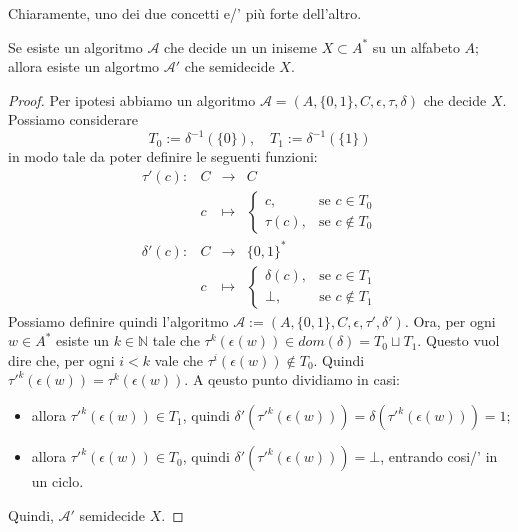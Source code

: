Chiaramente, uno dei due concetti e/' più forte dell'altro.
\begin{prop}
    Se esiste un algoritmo 
    $\mathcal A$
    che decide un un iniseme 
    $X \subset A^*$ su un alfabeto $A$;
    allora esiste un algortmo $\mathcal A'$
    che semidecide $X$.
    \begin{proof}
        Per ipotesi abbiamo un algoritmo
        $\mathcal A = (A,\{ 0,1\},C,\epsilon,\tau , \delta)$
        che decide $X$.
        Possiamo considerare
        \[
        T_0:=\delta^{-1}(\{0\}), \quad  T_1:=\delta^{-1}(\{1\})
        \]
        in modo tale da poter definire le seguenti funzioni:
        \[
        \begin{matrix}
        \tau'(c): & C & \to & C
            \\ & c & \mapsto &
        \left\{
            \begin{matrix}
                c, & \text{se } c \in T_0
                \\
                \tau (c), & \text{se } c \notin T_0
            \end{matrix}
        \right.
        \end{matrix}
        \] 
        \[
        \begin{matrix}
        \delta'(c): & C &\to & \{0,1\}^*
        \\& c & \mapsto &
        \left\{
            \begin{matrix}
                \delta (c), & \text{se } c \in T_1
                \\
                \bot, & \text{se } c \notin T_1
            \end{matrix}
        \right.
        \end{matrix}
        \]
    Possiamo definire quindi l'algoritmo
    $\mathcal A := (A,\{ 0,1\},C,\epsilon,\tau' , \delta')$. 
        Ora, per ogni 
        $w \in A^*$
        esiste un $k \in \mathbb N$
        tale che $\tau ^k(\epsilon (w)) \in dom(\delta)=T_0 \sqcup T_1$.
        Questo vuol dire che, per ogni $i <k$ vale che 
        $\tau ^i(\epsilon (w))\notin T_0$.
        Quindi $\tau'^{k}(\epsilon(w))=\tau^{k}(\epsilon(w))$.
    A qeusto punto dividiamo in casi:
    \begin{itemize}
        \item[$w \in X$:] allora $\tau'^{k}(\epsilon(w)) \in T_1$, quindi
        $\delta'(\tau'^{k}(\epsilon(w)))=\delta (\tau'^{k}(\epsilon(w)))=1$; 

        \item[$w \notin X$:] allora $\tau'^{k}(\epsilon(w)) \in T_0$, quindi
        $\delta'(\tau'^{k}(\epsilon(w)))=\bot$, entrando cosi/' in un ciclo. 
    \end{itemize}
    
    Quindi, $\mathcal A' $ semidecide $X$.

    \end{proof}
\end{prop}

